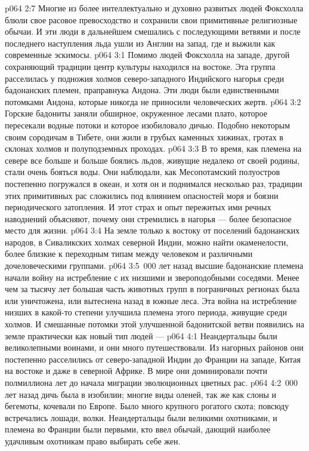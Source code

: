 \vs p064 2:7 Многие из более интеллектуально и духовно развитых людей Фоксхолла блюли свое расовое превосходство и сохранили свои примитивные религиозные обычаи. И эти люди в дальнейшем смешались с последующими ветвями и после последнего наступления льда ушли из Англии на запад, где и выжили как современные эскимосы.
\vs p064 3:1 Помимо людей Фоксхолла на западе, другой сохраняющий традиции центр культуры находился на востоке. Эта группа расселилась у подножия холмов северо\hyp{}западного Индийского нагорья среди бадонанских племен, праправнука Андона. Эти люди были единственными потомками Андона, которые никогда не приносили человеческих жертв.
\vs p064 3:2 Горские бадониты заняли обширное, окруженное лесами плато, которое пересекали водные потоки и которое изобиловало дичью. Подобно некоторым своим сородичам в Тибете, они жили в грубых каменных хижинах, гротах в склонах холмов и полуподземных проходах.
\vs p064 3:3 В то время, как племена на севере все больше и больше боялись льдов, живущие недалеко от своей родины, стали очень бояться воды. Они наблюдали, как Месопотамский полуостров постепенно погружался в океан, и хотя он и поднимался несколько раз, традиции этих примитивных рас сложились под влиянием опасностей моря и боязни периодического затопления. И этот страх и опыт пережитых ими речных наводнений объясняют, почему они стремились в нагорья --- более безопасное место для жизни.
\vs p064 3:4 На земле только к востоку от поселений бадонанских народов, в Сиваликских холмах северной Индии, можно найти окаменелости, более близкие к переходным типам между человеком и различными дочеловеческими группами.
\vs p064 3:5 \,000 лет назад высшие бадонанские племена начали войну на истребление с их низшими и звероподобными соседями. Менее чем за тысячу лет большая часть животных групп в пограничных регионах была или уничтожена, или вытеснена назад в южные леса. Эта война на истребление низших в какой\hyp{}то степени улучшила племена этого периода, живущие среди холмов. И смешанные потомки этой улучшенной бадонитской ветви появились на земле практически как новый тип людей --- 
\vs p064 4:1 Неандертальцы были великолепными воинами, и они много путешествовали. Из нагорных районов они постепенно расселились от северо\hyp{}западной Индии до Франции на западе, Китая на востоке и даже в северной Африке. В мире они доминировали почти полмиллиона лет до начала миграции эволюционных цветных рас.
\vs p064 4:2 \,000 лет назад дичь была в изобилии; многие виды оленей, так же как слоны и бегемоты, кочевали по Европе. Было много крупного рогатого скота; повсюду встречались лошади, волки. Неандертальцы были великими охотниками, и племена во Франции были первыми, кто ввел обычай, дающий наиболее удачливым охотникам право выбирать себе жен.
